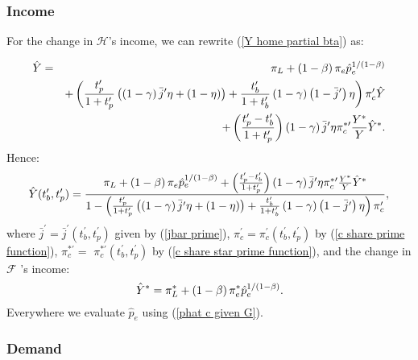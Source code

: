 \documentclass[notitlepage,12pt]{article}
\begin{document}
\subsubsection{Income}

For the change in $\mathcal{H}$'s income, we can rewrite (\ref{Y home
partial bta}) as:

\begin{eqnarray*}
\hat{Y} &=&\pi _{L}+\left( 1-\beta \right) \pi _{e}\hat{p}_{e}^{1/(1-\beta )}
\\
&&+\left( \frac{t_{p}^{\prime }}{1+t_{p}^{\prime }}\left( \left( 1-\gamma
\right) \bar{j}^{\prime }\eta +\left( 1-\eta \right) \right) +\frac{%
t_{b}^{\prime }}{1+t_{b}^{\prime }}\left( 1-\gamma \right) \left( 1-\bar{j}%
^{\prime }\right) \eta \right) \pi _{c}^{\prime }\hat{Y} \\
&&+\left( \frac{t_{p}^{\prime }-t_{b}^{\prime }}{1+t_{p}^{\prime }}\right)
\left( 1-\gamma \right) \bar{j}^{\prime }\eta \pi _{c}^{\ast \prime }\frac{%
Y^{\ast }}{Y}\hat{Y}^{\ast }.
\end{eqnarray*}%
Hence:%
\begin{equation}
\hat{Y}(t_{b}^{\prime },t_{p}^{\prime })=\frac{\pi _{L}+\left( 1-\beta
\right) \pi _{e}\hat{p}_{e}^{1/(1-\beta )}+\left( \frac{t_{p}^{\prime
}-t_{b}^{\prime }}{1+t_{p}^{\prime }}\right) \left( 1-\gamma \right) \bar{j}%
^{\prime }\eta \pi _{c}^{\ast \prime }\frac{Y^{\ast }}{Y}\hat{Y}^{\ast }}{%
1-\left( \frac{t_{p}^{\prime }}{1+t_{p}^{\prime }}\left( \left( 1-\gamma
\right) \bar{j}^{\prime }\eta +\left( 1-\eta \right) \right) +\frac{%
t_{b}^{\prime }}{1+t_{b}^{\prime }}\left( 1-\gamma \right) \left( 1-\bar{j}%
^{\prime }\right) \eta \right) \pi _{c}^{\prime }},
\label{Y hat partial btas}
\end{equation}%
where $\bar{j}^{\prime }=\bar{j}^{\prime }(t_{b}^{\prime },t_{p}^{\prime })$
given by (\ref{jbar prime}), $\pi _{c}^{\prime }=\pi _{c}^{\prime
}(t_{b}^{\prime },t_{p}^{\prime })$ by (\ref{c share prime function}), $\pi
_{c}^{\ast \prime }=$ $\pi _{c}^{\ast \prime }(t_{b}^{\prime },t_{p}^{\prime
})$ by (\ref{c share star prime function}), and the change in $\mathcal{F}$%
's income:%
\begin{equation}
\hat{Y}^{\ast }=\pi _{L}^{\ast }+\left( 1-\beta \right) \pi _{e}^{\ast }\hat{%
p}_{e}^{1/(1-\beta )}.  \label{Y star hat partial btas}
\end{equation}%
Everywhere we evaluate $\hat{p}_{e}$ using (\ref{phat c given G}).

\subsubsection{Demand}
\end{document}
